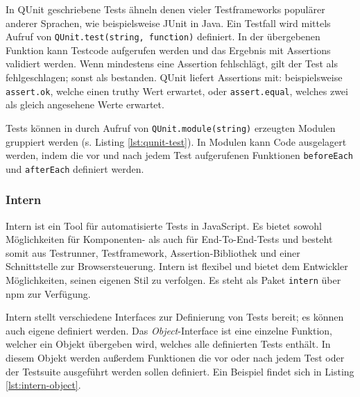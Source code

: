 In QUnit geschriebene Tests ähneln denen vieler Testframeworks populärer anderer Sprachen, wie beispielsweise JUnit in Java. Ein Testfall wird mittels Aufruf von \texttt{QUnit.test(string, function)} definiert. In der übergebenen Funktion kann Testcode aufgerufen werden und das Ergebnis mit Assertions validiert werden. Wenn mindestens eine Assertion fehlschlägt, gilt der Test als fehlgeschlagen; sonst als bestanden. QUnit liefert Assertions mit: beispielsweise \texttt{assert.ok}, welche einen truthy Wert erwartet, oder \texttt{assert.equal}, welches zwei als gleich angesehene Werte erwartet.\cite{qunit-cookbook}

Tests können in durch Aufruf von \texttt{QUnit.module(string)} erzeugten Modulen gruppiert werden (s. Listing \ref{lst:qunit-test}). In Modulen kann Code ausgelagert werden, indem die vor und nach jedem Test aufgerufenen Funktionen \texttt{beforeEach} und \texttt{afterEach} definiert werden.\cite{qunit-cookbook}

\begin{figure}[H]
	
\end{figure}

\subsubsection{Intern}
\label{sec:Intern}
Intern ist ein Tool für automatisierte Tests in JavaScript. Es bietet sowohl Möglichkeiten für Komponenten- als auch für End-To-End-Tests und besteht somit aus Testrunner, Testframework, Assertion-Bibliothek und einer Schnittstelle zur Browsersteuerung. Intern ist flexibel und bietet dem Entwickler Möglichkeiten, seinen eigenen Stil zu verfolgen. Es steht als Paket \texttt{intern} über npm zur Verfügung.\cite{intern-userguide}

Intern stellt verschiedene Interfaces zur Definierung von Tests bereit; es können auch eigene definiert werden. Das \textit{Object}-Interface ist eine einzelne Funktion, welcher ein Objekt übergeben wird, welches alle definierten Tests enthält. In diesem Objekt werden außerdem Funktionen die vor oder nach jedem Test oder der Testsuite ausgeführt werden sollen definiert. Ein Beispiel findet sich in Listing \ref{lst:intern-object}.\cite{intern-userguide}

\begin{figure}[H]
	
\end{figure}

